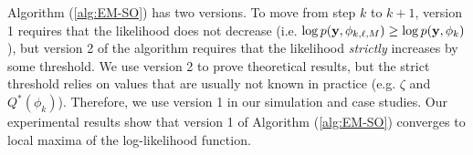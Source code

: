 
Algorithm (\ref{alg:EM-SO}) has two versions. To move from step $k$ to $k+1$, version 1 requires that the likelihood does not decrease (i.e. $\log p(\mathbf{y},\phi_{k,\ell,M}) \geq \log p(\mathbf{y},\phi_{k})$), but version 2 of the algorithm requires that the likelihood \textit{strictly} increases by some threshold. We use version 2 to prove theoretical results, but the strict threshold relies on values that are usually not known in practice (e.g. $\zeta$ and $Q^*(\phi_{k})$). Therefore, we use version 1 in our simulation and case studies. Our experimental results show that version 1 of Algorithm (\ref{alg:EM-SO}) converges to local maxima of the log-likelihood function.

